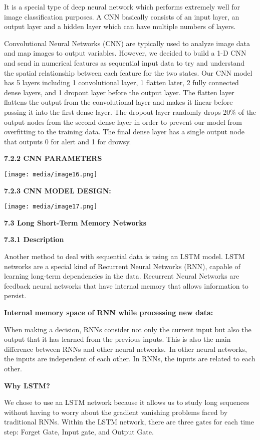 \documentclass[a4paper,12pt]{article}
\begin{document}
It is a special type of deep neural network which performs extremely
well for image classification purposes. A CNN basically consists of an
input layer, an output layer and a hidden layer which can have multiple
numbers of layers.

Convolutional Neural Networks (CNN) are typically used to analyze image
data and map images to output variables. However, we decided to build a
1-D CNN and send in numerical features as sequential input data to try
and understand the spatial relationship between each feature for the two
states. Our CNN model has 5 layers including 1 convolutional layer, 1
flatten later, 2 fully connected dense layers, and 1 dropout layer
before the output layer. The flatten layer flattens the output from the
convolutional layer and makes it linear before passing it into the first
dense layer. The dropout layer randomly drops 20\% of the output nodes
from the second dense layer in order to prevent our model from
overfitting to the training data. The final dense layer has a single
output node that outputs 0 for alert and 1 for drowsy.

\textbf{7.2.2 CNN PARAMETERS}

\texttt{[image: media/image16.png]}

\textbf{7.2.3 CNN MODEL DESIGN:}

\texttt{[image: media/image17.png]}

\textbf{7.3 Long Short-Term Memory Networks}

\textbf{7.3.1 Description}

Another method to deal with sequential data is using an LSTM model. LSTM
networks are a special kind of Recurrent Neural Networks (RNN), capable
of learning long-term dependencies in the data. Recurrent Neural
Networks are feedback neural networks that have internal memory that
allows information to persist.

\textbf{Internal memory space of RNN while processing new data:}

When making a decision, RNNs consider not only the current input but
also the output that it has learned from the previous inputs. This is
also the main difference between RNNs and other neural networks.~In
other neural networks, the inputs are independent of each other. In
RNNs, the inputs are related to each other.

\textbf{Why LSTM?}

We chose to use an LSTM network because it allows us to study long
sequences without having to worry about the gradient vanishing problems
faced by traditional RNNs. Within the LSTM network, there are three
gates for each time step: Forget Gate, Input gate, and Output Gate.
\end{document}
